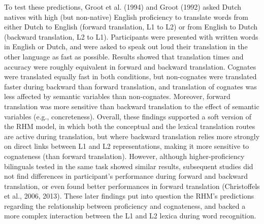 \documentclass[
  english,
  man,floatsintext]{apa7}
\begin{document}
To test these predictions, Groot et al. (1994) and Groot (1992) asked Dutch natives with high (but non-native) English proficiency to translate words from either Dutch to English (forward translation, L1 to L2) or from English to Dutch (backward translation, L2 to L1). Participants were presented with written words in English or Dutch, and were asked to speak out loud their translation in the other language as fast as possible. Results showed that translation times and accuracy were roughly equivalent in forward and backward translation. Cognates were translated equally fast in both conditions, but non-cognates were translated faster during backward than forward translation, and translation of cognates was less affected by semantic variables than non-cognates. Moreover, forward translation was more sensitive than backward translation to the effect of semantic variables (e.g., concreteness). Overall, these findings supported a soft version of the RHM model, in which both the conceptual and the lexical translation routes are active during translation, but where backward translation relies more strongly on direct links between L1 and L2 representations, making it more sensitive to cognateness (than forward translation). However, although higher-proficiency bilinguals tested in the same task showed similar results, subsequent studies did not find differences in participant's performance during forward and backward translation, or even found better performances in forward translation (Christoffels et al., 2006, 2013). These later findings put into question the RHM's predictions regarding the relationship between proficiency and cognateness, and backed a more complex interaction between the L1 and L2 lexica during word recognition.
\end{document}
